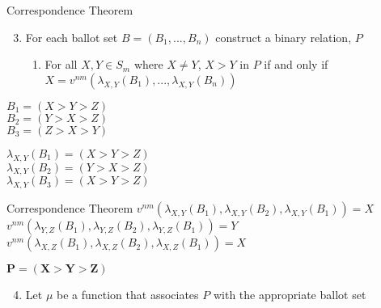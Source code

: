 \documentclass{beamer}
\begin{document}
\begin{frame}{Correspondence Theorem}
    \begin{enumerate}
    \setcounter{enumi}{2}
        \item For each ballot set $B = (B_1, ... , B_n)$ construct a binary relation, $P$
        \begin{enumerate}
            \item For all $X,Y \in S_m$ where $X \ne Y$, $X > Y$ in $P$ if and only if $X = v^{nm}(\lambda_{X,Y}(B_1), ..., \lambda_{X,Y}(B_n))$
        \end{enumerate}
    \end{enumerate}

\vskip 0.15cm

\begin{example}
\large \begin{multicols}{2} %
        $B_1 = (X > Y > Z)$ \\
        $B_2 = (Y > X > Z)$ \\
        $B_3 = (Z > X > Y)$

        $\lambda_{X,Y}(B_1) = (X > Y > Z)$ \\
        $\lambda_{X,Y}(B_2) = (Y > X > Z)$ \\
        $\lambda_{X,Y}(B_3) = (X > Y > Z)$ \\
    \end{multicols}
\end{example}
\end{frame}

\begin{frame}{Correspondence Theorem}
\Large \center $v^{nm}(\lambda_{X,Y}(B_1), \lambda_{X,Y}(B_2), \lambda_{X,Y}(B_1)) = X$ \\
\center $v^{nm}(\lambda_{Y,Z}(B_1), \lambda_{Y,Z}(B_2), \lambda_{Y,Z}(B_1)) = Y$
\center $v^{nm}(\lambda_{X,Z}(B_1), \lambda_{X,Z}(B_2), \lambda_{X,Z}(B_1)) = X$

\vskip 1cm

$\mathbf{P = (X > Y > Z)}$

\vskip 1cm

\large \begin{enumerate}
\setcounter{enumi}{3}
    \item Let $\mu$ be a function that associates $P$ with the appropriate ballot set
\end{enumerate}
\end{frame}
\end{document}
